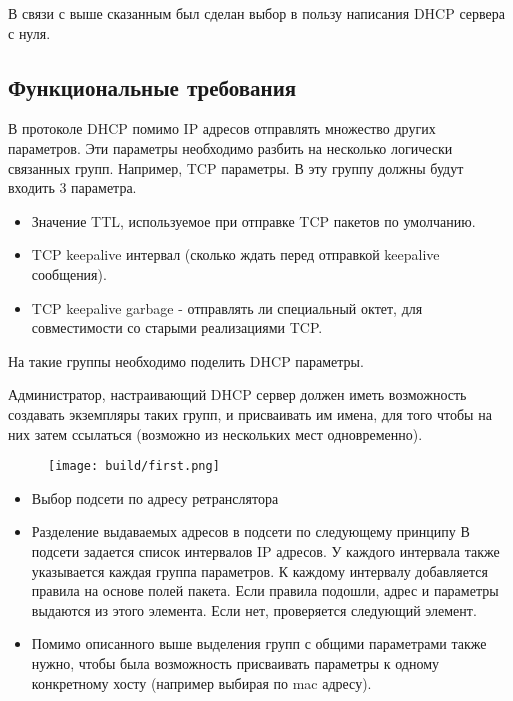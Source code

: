 \documentclass[12pt]{article}
\begin{document}
В связи с выше сказанным был сделан выбор в пользу написания DHCP сервера с нуля.

\subsection{Функциональные требования}

В протоколе DHCP помимо IP адресов отправлять множество других параметров.
Эти параметры необходимо разбить на несколько логически связанных групп.
Например, TCP параметры. В эту группу должны будут входить 3 параметра.

\begin{itemize}
    \item Значение TTL, используемое при отправке TCP пакетов по умолчанию.
    \item TCP keepalive интервал (сколько ждать перед отправкой keepalive сообщения).
    \item TCP keepalive garbage - отправлять ли специальный октет, для совместимости со старыми реализациями TCP.
\end{itemize}

На такие группы необходимо поделить DHCP параметры.

Администратор, настраивающий DHCP сервер должен иметь возможность создавать экземпляры таких групп, и присваивать им имена, для того чтобы на них затем ссылаться (возможно из нескольких мест одновременно).

\begin{figure}[H]
    \texttt{[image: build/first.png]}
    \caption{}
\end{figure}

\begin{itemize}
    \item Выбор подсети по адресу ретранслятора
    \item Разделение выдаваемых адресов в подсети по следующему принципу
        \subitem В подсети задается список интервалов IP адресов.
        \subitem У каждого интервала также указывается каждая группа параметров.
        \subitem К каждому интервалу добавляется правила на основе полей пакета.
        \subitem Если правила подошли, адрес и параметры выдаются из этого элемента.
        \subitem Если нет, проверяется следующий элемент.
    \item Помимо описанного выше выделения групп с общими параметрами также нужно, чтобы была возможность присваивать параметры к одному конкретному хосту (например выбирая по mac адресу).
\end{itemize}
\end{document}
